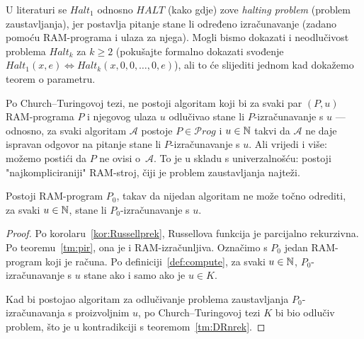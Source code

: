 U literaturi se $Halt_1$ odnosno $HALT$ (kako gdje) zove \emph{halting problem} (problem zaustavljanja), jer postavlja pitanje stane li određeno izračunavanje (zadano pomoću RAM-programa i ulaza za njega). Mogli bismo dokazati i neodlučivost problema $Halt_k$ za $k\ge 2$ (pokušajte formalno dokazati svođenje $Halt_1(x,e)\Leftrightarrow Halt_k(x,0,0,\dotsc,0,e)$), ali to će slijediti jednom kad dokažemo teorem o parametru.

Po Church--\!Turingovoj tezi, ne postoji algoritam koji bi za svaki par $(P,u)$ RAM-programa $P$ i njegovog ulaza $u$ odlučivao stane li $P$-izračunavanje s $u$ --- odnosno, za svaki algoritam $\mathcal A$ postoje $P\in\mathscr Prog$ i $u\in{\mathbb N}$ takvi da $\mathcal A$ ne daje ispravan odgovor na pitanje stane li $P$-izračunavanje s $u$. Ali vrijedi i više: možemo postići da $P$ ne ovisi o~$\mathcal A$. To je u skladu s univerzalnošću: postoji "najkompliciraniji" RAM-stroj, čiji je problem zaustavljanja najteži.

\begin{korolar}[{name=[neodlučivost problema zaustavljanja za jedan fiksni RAM-stroj]}]\label{kor:RAMhaltnodl}
Postoji RAM-program $P_0$, takav da nijedan algoritam ne može točno odrediti,\\ za svaki $u\in{\mathbb N}$, stane li $P_0$-izračunavanje s $u$.
\end{korolar}
\begin{proof}
Po korolaru~\ref{kor:Russellprek}, Russellova funkcija je parcijalno rekurzivna. Po teoremu~\ref{tm:pir}, ona je i RAM-izračunljiva. Označimo s $P_0$ jedan RAM-program koji je računa. Po definiciji~\ref{def:compute}, za svaki $u\in{\mathbb N}$, $P_0$-izračunavanje s $u$ stane ako i samo ako je $u\in K$.

Kad bi postojao algoritam za odlučivanje problema zaustavljanja $P_0$-izračunavanja s proizvoljnim $u$, po Church--\!Turingovoj tezi $K$ bi bio odlučiv problem, što je u kontradikciji s teoremom~\ref{tm:DRnrek}.
\end{proof}

